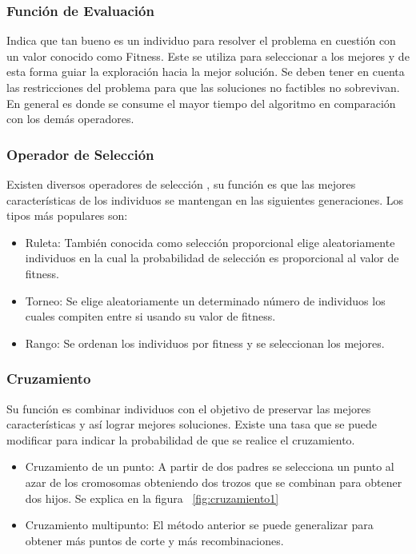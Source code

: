 \subsubsection{Función de Evaluación} 
Indica que tan bueno es un individuo para resolver el problema en cuestión con un valor conocido como Fitness. Este se utiliza para seleccionar a los mejores y de esta forma guiar la exploración hacia la mejor solución.
Se deben tener en cuenta las restricciones del problema para que las soluciones no factibles no sobrevivan.
En general es donde se consume el mayor tiempo del algoritmo en comparación con los demás operadores.

\subsubsection{Operador de Selección}
Existen diversos operadores de selección , su función es que las mejores características de los individuos se mantengan en las siguientes generaciones.
Los tipos más populares son:

\begin{itemize}
	\item Ruleta: También conocida como selección proporcional elige aleatoriamente individuos en la cual la probabilidad de selección es proporcional al valor de fitness.
	\item Torneo: Se elige aleatoriamente un determinado número de individuos los cuales compiten entre si usando su valor de fitness.
	\item Rango: Se ordenan los individuos por fitness y se seleccionan los mejores.
\end{itemize}

\subsubsection{Cruzamiento}
Su función es combinar individuos con el objetivo de preservar las mejores características y así lograr mejores soluciones. 
Existe una tasa que se puede modificar para indicar la probabilidad de que se realice el cruzamiento.

\begin{itemize}
	\item Cruzamiento de un punto: A partir de dos padres se selecciona un punto al azar de los cromosomas obteniendo dos trozos que se combinan para obtener dos hijos. Se explica en la figura ~\ref{fig:cruzamiento1}
	\item Cruzamiento multipunto: El método anterior se puede generalizar para obtener más puntos de corte y más recombinaciones.
\end{itemize}

